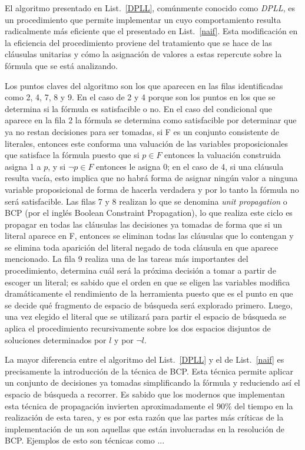 El algoritmo presentado en List.~\ref{DPLL}, comúnmente conocido como \emph{DPLL}, es un procedimiento que permite implementar un \ssolver cuyo comportamiento resulta radicalmente más eficiente que el presentado en List.~\ref{naif}. Esta modificación en la eficiencia del procedimiento proviene del tratamiento que se hace de las cláusulas unitarias y cómo la asignación de valores a estas repercute sobre la fórmula que se está analizando. 

Los puntos claves del algoritmo son los que aparecen en las filas identificadas como 2, 4, 7, 8 y 9. En el caso de 2 y 4 porque son los puntos en los que se determina si la fórmula es satisfacible o no. En el caso del condicional que aparece en la fila 2 la fórmula se determina como satisfacible por determinar que ya no restan decisiones para ser tomadas, si F es un conjunto consistente de literales, entonces este conforma una valuación de las variables proposicionales que satisface la fórmula puesto que si $p \in F$ entonces la valuación construida asigna 1 a $p$, y si $\neg p \in F$ entonces le asigna 0; en el caso de 4, si una cláusula resulta vacía, esto implica que no habrá forma de asignar ningún valor a ninguna variable proposicional de forma de hacerla verdadera y por lo tanto la fórmula no será satisfacible. Las filas 7 y 8 realizan lo que se denomina \emph{unit propagation} o BCP (por el inglés Boolean Constraint Propagation), lo que realiza este ciclo es propagar en todas las cláusulas las decisiones ya tomadas de forma que si un literal aparece en F, entonces se eliminan todas las cláusulas que lo contengan y se elimina toda aparición del literal negado de toda cláusula en que aparece mencionado. La fila 9 realiza una de las tareas más importantes del procedimiento, determina cuál será la próxima decisión a tomar a partir de escoger un literal; es sabido que el orden en que se eligen las variables modifica dramáticamente el rendimiento de la herramienta puesto que es el punto en que se decide qué fragmento de espacio de búsqueda será explorado primero. Luego, una vez elegido el literal que se utilizará para partir el espacio de búsqueda se aplica el procedimiento recursivamente sobre los dos espacios disjuntos de soluciones determinados por $l$ y por $\neg l$.

La mayor diferencia entre el algoritmo del List.~\ref{DPLL} y el de List.~\ref{naif} es precisamente la introducción de la técnica de BCP. Esta técnica permite aplicar un conjunto de decisiones ya tomadas simplificando la fórmula y reduciendo así el espacio de búsqueda a recorrer. Es sabido \cite{moskewicz:da01} que los \ssolver modernos que implementan esta técnica de propagación invierten aproximadamente el 90\% del tiempo en la realización de esta tarea, y es por esta razón que las partes más críticas de la implementación de un \ssolver son aquellas que están involucradas en la resolución de BCP. Ejemplos de esto son técnicas como ...



